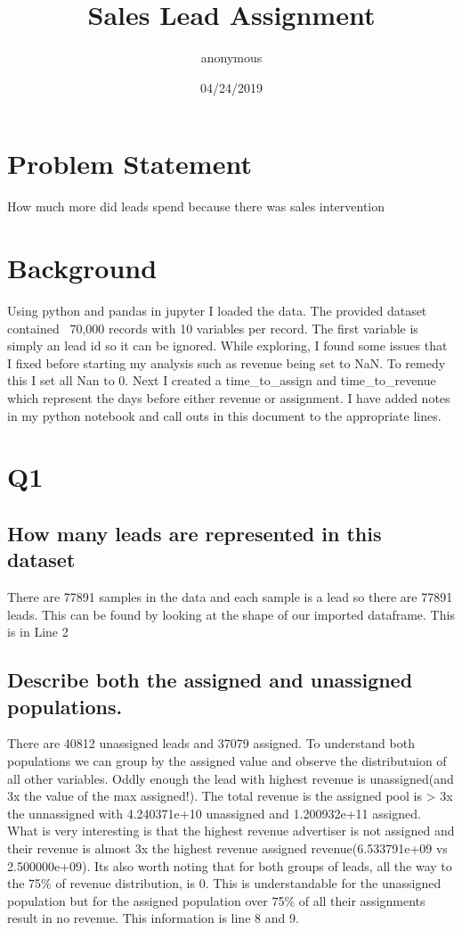 \documentclass[11pt]{article}
\begin{document}
\title{Sales Lead Assignment}
\author{anonymous}
\date{04/24/2019}
\maketitle 
\section{Problem Statement}
How much more did leads spend because there was sales intervention
\section{Background}
Using python and pandas in jupyter I loaded the data. The provided dataset contained ~70,000 records with 10 variables per record. The first variable is simply an lead id so it can be ignored. While exploring, I found some issues that I fixed before starting my analysis such as revenue being set to NaN. To remedy this I set all Nan to 0. Next I created a time\_to\_assign and time\_to\_revenue which represent the days before either revenue or assignment. I have added notes in my python notebook and call outs in this document to the appropriate lines.
\section{Q1}
\subsection{How many leads are represented in this dataset}
There are 77891 samples in the data and each sample is a lead so there are 77891 leads. This can be found by looking at the shape of our imported dataframe. This is in Line 2
\subsection{Describe both the assigned and unassigned populations.}
There are 40812 unassigned leads and 37079 assigned. To understand both populations we can group by the assigned value and observe the distributuion of all other variables. Oddly enough the lead with highest revenue is unassigned(and 3x the value of the max assigned!). The total revenue is the assigned pool is > 3x the unnassigned with 4.240371e+10 unassigned and  1.200932e+11 assigned. What is very interesting is that the highest revenue advertiser is not assigned and their revenue is almost 3x the highest revenue assigned revenue(6.533791e+09 vs 2.500000e+09). Its also worth noting that for both groups of leads, all the way to the 75\% of revenue distribution, is 0. This is understandable for the unassigned population but for the assigned population over 75\% of all their assignments result in no revenue. This information is line 8 and 9.
\end{document}
